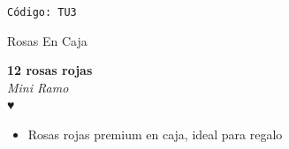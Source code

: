 \documentclass[12pt]{article}
\begin{document}
\begin{center}
    \textcolor[HTML]{191970}{\texttt{Código: TU3}}
\end{center}
\vspace{1cm}
\newpage
\begin{center}\textcolor[HTML]{191970}{\huge Rosas En Caja}\end{center}
\noindent
\begin{minipage}{0.6\textwidth}
    \textcolor[HTML]{FF8C00}{\textbf{\huge 12 rosas rojas }}\\
    {\textit{Mini Ramo}} \\
    \textcolor[HTML]{FF8C00}{\Huge ♥} \\
    \vspace{0.5cm}
    \begin{itemize}
        \item Rosas rojas premium en caja, ideal para regalo
    \end{itemize}
\end{minipage}
\hspace{1cm}
\end{document}
